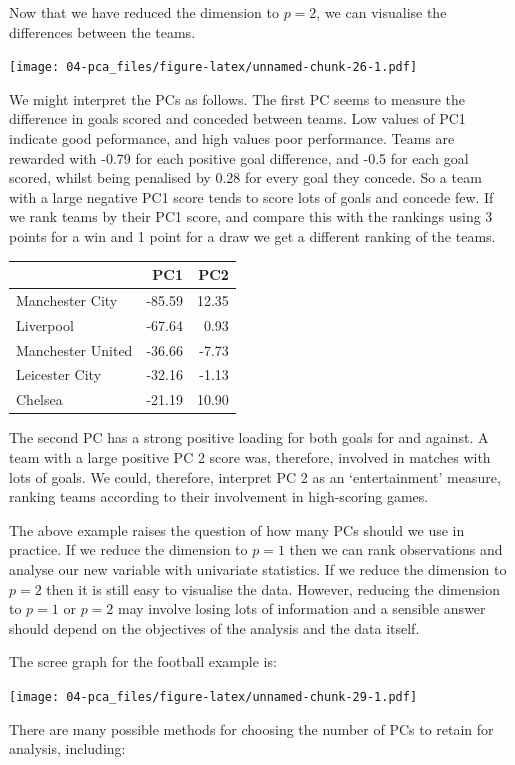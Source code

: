 \documentclass[]{book}
\theoremstyle{definition}
\theoremstyle{definition}
\theoremstyle{definition}
\theoremstyle{remark}
\begin{document}
Now that we have reduced the dimension to \(p=2\), we can visualise the differences between the teams.

\texttt{[image: 04-pca\_files/figure-latex/unnamed-chunk-26-1.pdf]}

We might interpret the PCs as follows. The first PC seems to measure the difference in goals scored and conceded between teams. Low values of PC1 indicate good peformance, and high values poor performance. Teams are rewarded with -0.79 for each positive goal difference, and -0.5 for each goal scored, whilst being penalised by 0.28 for every goal they concede. So a team with a large negative PC1 score tends to score lots of goals and concede few. If we rank teams by their PC1 score, and compare this with the rankings using 3 points for a win and 1 point for a draw we get a different ranking of the teams.

\begin{tabular}{lrr}
\toprule
  & PC1 & PC2\\
\midrule
Manchester City & -85.59 & 12.35\\
Liverpool & -67.64 & 0.93\\
Manchester United & -36.66 & -7.73\\
Leicester City & -32.16 & -1.13\\
Chelsea & -21.19 & 10.90\\
\bottomrule
\end{tabular}

The second PC has a strong positive loading for both goals for and against. A team with a large positive PC 2 score was, therefore, involved in matches with lots of goals. We could, therefore, interpret PC 2 as an `entertainment' measure, ranking teams according to their involvement in high-scoring games.

The above example raises the question of how many PCs should we use in practice. If we reduce the dimension to \(p=1\) then we can rank observations and analyse our new variable with univariate statistics. If we reduce the dimension to \(p=2\) then it is still easy to visualise the data. However, reducing the dimension to \(p=1\) or \(p=2\) may involve losing lots of information and a sensible answer should depend on the objectives of the analysis and the data itself.

The scree graph for the football example is:

\texttt{[image: 04-pca\_files/figure-latex/unnamed-chunk-29-1.pdf]}

There are many possible methods for choosing the number of PCs to retain for analysis, including:
\end{document}
